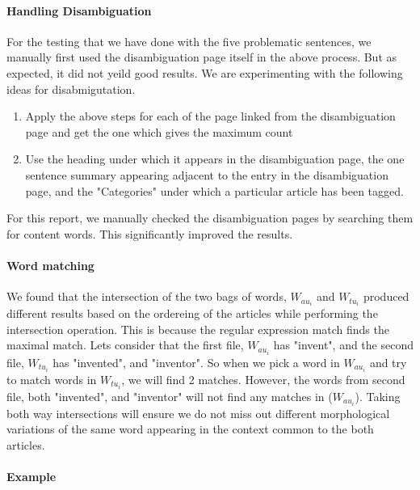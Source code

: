 \documentclass[11pt]{article}
\begin{document}
\paragraph{Handling Disambiguation}
For the testing that we have done with the five problematic sentences, we manually first used the disambiguation page itself in the above process. But as expected, it did not yeild good results. We are experimenting with the following ideas for disabmigutation.
\begin{enumerate}
\item Apply the above steps for each of the page linked from the disambiguation page and get the one which gives the maximum count
\item Use the heading under which it appears in the disambiguation page, the one sentence summary appearing adjacent to the entry in the disambiguation page, and the "Categories" under which a particular article has been tagged.
\end{enumerate}
For this report, we manually checked the disambiguation pages by searching them for content words. This significantly improved the results.

\paragraph{Word matching}
We found that the intersection of the two bags of words, $W_{au_{i}}$ and $W_{tu_{i}}$ produced different results based on the ordereing of the articles while performing the intersection operation. This is because the regular expression match finds the maximal match. Lets consider that the first file, $W_{au_{i}}$ has "invent", and the second file, $W_{tu_{i}}$ has "invented", and "inventor". So when we pick a word in $W_{au_{i}}$ and try to match words in $W_{tu_{i}}$, we will find 2 matches. However, the words from second file, both "invented", and "inventor" will not find any matches in ($W_{au_{i}}$). Taking both way intersections will ensure we do not miss out different morphological variations of the same word appearing in the context common to the both articles.

\paragraph{Example}
\end{document}
